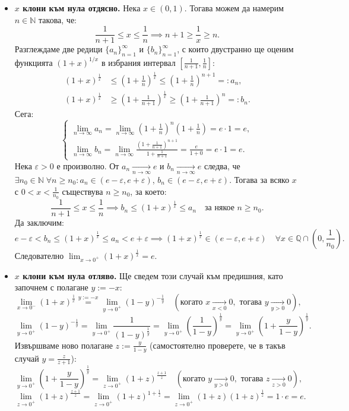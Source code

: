 \begin{itemize}
    \item \textbf{$x$ клони към нула отдясно.} Нека $x \in (0, 1)$. Тогава можем да намерим $n \in \mathbb{N}$ такова, че:
    \[
    \frac{1}{n + 1} \le x \le \frac{1}{n} \implies n + 1 \ge \frac{1}{x} \ge n.
    \]
    Разглеждаме две редици $\{a_n\}_{n=1}^{\infty}$ и $\{b_n\}_{n=1}^{\infty}$, с които двустранно ще оценим функцията $(1 + x)^{1/x}$ в избрания интервал $\left[ \frac{1}{n+1}, \frac{1}{n} \right]$:
    \begin{align*}
    (1 + x)^{\frac{1}{x}} &\le \left( 1 + \frac{1}{n} \right)^{\frac{1}{x}} \le \left( 1 + \frac{1}{n} \right)^{n+1} =: a_n, \\
    (1 + x)^{\frac{1}{x}} &\ge \left( 1 + \frac{1}{n+1} \right)^{\frac{1}{x}} \ge \left( 1 + \frac{1}{n+1} \right)^n =: b_n.
    \end{align*}
    Сега:
    \[
    \begin{cases}
    \lim_{n \to \infty} a_n = \lim_{n \to \infty} \left( 1 + \frac{1}{n} \right)^n \left( 1 + \frac{1}{n} \right) = e \cdot 1 = e, \\
    \lim_{n \to \infty} b_n = \lim_{n \to \infty} \frac{\left( 1 + \frac{1}{n+1} \right)^{n+1}}{1 + \frac{1}{n+1}} = \frac{e}{1 + 0} = e \cdot 1 = e.
    \end{cases}
    \]
    Нека $\varepsilon > 0$ е произволно. От $a_n \xrightarrow[n \to \infty]{} e$ и $b_n \xrightarrow[n \to \infty]{} e$ следва, че $\exists n_0 \in \mathbb{N} \; \forall n \ge n_0 : a_n \in (e - \varepsilon, e + \varepsilon)$, $b_n \in (e - \varepsilon, e + \varepsilon)$. Тогава за всяко $x$ с $0 < x < \frac{1}{n_0}$ съществува $n \ge n_0$, за което:
    \[
    \frac{1}{n+1} \le x \le \frac{1}{n} \implies b_n \le (1 + x)^{\frac{1}{x}} \le a_n \quad \text{за някое } n \ge n_0.
    \]
    Да заключим:
    \[
    e - \varepsilon < b_n \le (1 + x)^{\frac{1}{x}} \le a_n < e + \varepsilon \implies (1 + x)^{\frac{1}{x}} \in (e - \varepsilon, e + \varepsilon) \quad \forall x \in \mathbb{Q} \cap \left( 0, \frac{1}{n_0} \right).
    \]
    Следователно $\lim_{x \to 0^+} (1 + x)^{\frac{1}{x}} = e$.

    \item \textbf{$x$ клони към нула отляво.} Ще сведем този случай към предишния, като започнем с полагане $y := -x$:
    \[
    \lim_{x \to 0^-} (1 + x)^{\frac{1}{x}} \overset{y := -x}{=} \lim_{y \to 0^+} (1 - y)^{-\frac{1}{y}} \quad (\text{когато } x \xrightarrow[x < 0]{} 0, \text{ тогава } y \xrightarrow[y > 0]{} 0),
    \]
    \[
    \lim_{y \to 0^+} (1 - y)^{-\frac{1}{y}} = \lim_{y \to 0^+} \frac{1}{(1 - y)^{\frac{1}{y}}} = \lim_{y \to 0^+} \left( \frac{1}{1 - y} \right)^{\frac{1}{y}} = \lim_{y \to 0^+} \left( 1 + \frac{y}{1 - y} \right)^{\frac{1}{y}}.
    \]
    Извършваме ново полагане $z := \frac{y}{1 - y}$ (самостоятелно проверете, че в такъв случай $y = \frac{z}{z + 1}$):
    \[
    \lim_{y \to 0^+} \left( 1 + \frac{y}{1 - y} \right)^{\frac{1}{y}} = \lim_{z \to 0^+} (1 + z)^{\frac{z+1}{z}} \quad (\text{когато } y \xrightarrow[y > 0]{} 0, \text{ тогава } z \xrightarrow[z > 0]{} 0),
    \]
    \[
    \lim_{z \to 0^+} (1 + z)^{\frac{z+1}{z}} = \lim_{z \to 0^+} (1 + z)^{1 + \frac{1}{z}} = \lim_{z \to 0^+} (1 + z)(1 + z)^{\frac{1}{z}} = 1 \cdot e = e.
    \]
\end{itemize}